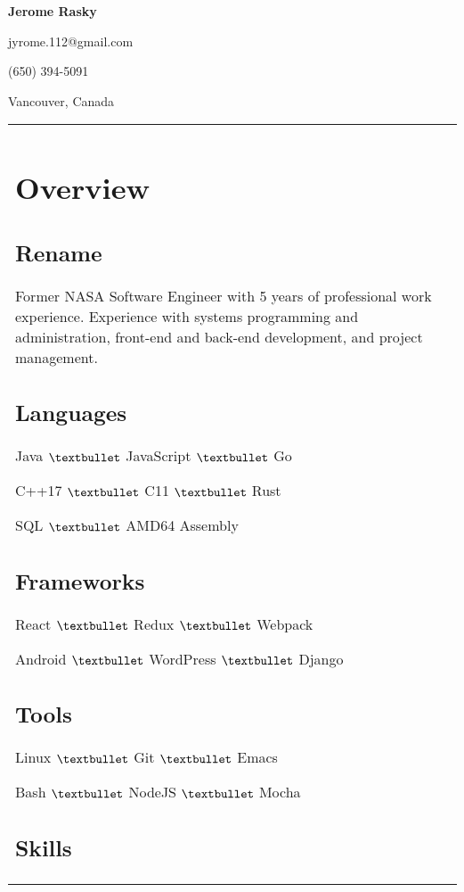 \documentclass[letterpaper]{article}
\newlength{\leftcol}
\newlength{\rightcol}
\begin{document}
\bodyfont
\large
{}

{\fontsize{32pt}{32pt}\bfseries\headingfont Jerome Rasky}

\vspace*{.5\baselineskip}

jyrome.112@gmail.com

(650) 394-5091

Vancouver, Canada

\begin{tabularx}{\textwidth}{@{}p{\leftcol} p{\rightcol}}
\raggedright
\section*{Overview}
\subsection*{Rename}

Former NASA Software Engineer with 5 years of professional work experience.
Experience with systems programming and administration, front-end and back-end
development, and project management.

\subsection*{Languages}

Java $\textbullet$ JavaScript $\textbullet$ Go

C++17 $\textbullet$ C11 $\textbullet$ Rust

SQL $\textbullet$ AMD64 Assembly

\subsection*{Frameworks}

React $\textbullet$ Redux $\textbullet$ Webpack

Android $\textbullet$ WordPress $\textbullet$ Django

\subsection*{Tools}

Linux $\textbullet$ Git $\textbullet$ Emacs

Bash $\textbullet$ NodeJS $\textbullet$ Mocha

\subsection*{Skills}


\end{tabularx}
\end{document}
